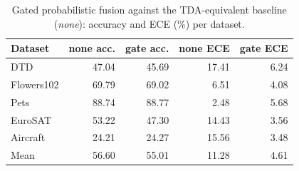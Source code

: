 \begin{table}[htbp]
\centering
\begin{tabular}{lrrrr}
\toprule
Dataset & none acc. & gate acc. & none ECE & gate ECE \\
\midrule
DTD & 47.04 & 45.69 & 17.41 & 6.24 \\
Flowers102 & 69.79 & 69.02 & 6.51 & 4.08 \\
Pets & 88.74 & 88.77 & 2.48 & 5.68 \\
EuroSAT & 53.22 & 47.30 & 14.43 & 3.56 \\
Aircraft & 24.21 & 24.27 & 15.56 & 3.48 \\
Mean & 56.60 & 55.01 & 11.28 & 4.61 \\
\bottomrule
\end{tabular}
\caption{Gated probabilistic fusion against the TDA-equivalent baseline (\emph{none}): accuracy and ECE (\%) per dataset.}
\label{tab:gate}
\end{table}
